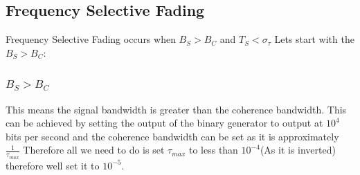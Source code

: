 \documentclass[a4paper,12pt]{scrartcl}
\begin{document}
{{		\subsection{Frequency Selective Fading}
		{
			Frequency Selective Fading occurs when $B_S > B_C$ and $T_S < \sigma_\tau$ Lets start with the $B_S > B_C$:
			\subsubsection{\texorpdfstring{$B_S > B_C$}{}}
			{
				\label{sec:BS>BC}
				This means the signal bandwidth is greater than the coherence bandwidth. This can be achieved by setting the output of the binary generator to output at $10^4$ bits per second and the coherence bandwidth can be set as it is approximately $\frac{1}{\tau_{max}}$ Therefore all we need to do is set $\tau_{max}$ to less than $10^{-4}$(As it is inverted) therefore well set it to $10^{-5}$.
			}
}}}
\end{document}
